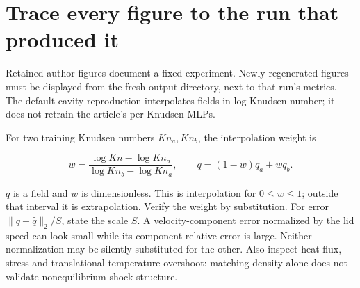 \section*{Trace every figure to the run that produced it}
Retained author figures document a fixed experiment. Newly regenerated figures
must be displayed from the fresh output directory, next to that run's metrics.
The default cavity reproduction interpolates fields in log Knudsen number; it
does not retrain the article's per-Knudsen MLPs.

For two training Knudsen numbers $Kn_a,Kn_b$, the interpolation weight is

\[w=\frac{\log Kn-\log Kn_a}{\log Kn_b-\log Kn_a},\qquad
q=(1-w)q_a+wq_b.\]

$q$ is a field and $w$ is dimensionless. This is interpolation for $0\le w\le1$;
outside that interval it is extrapolation. Verify the weight by substitution.
For error $\|q-\hat q\|_2/S$, state the scale $S$. A velocity-component error
normalized by the lid speed can look small while its component-relative error
is large. Neither normalization may be silently substituted for the other.
Also inspect heat flux, stress and translational-temperature overshoot: matching
density alone does not validate nonequilibrium shock structure.
